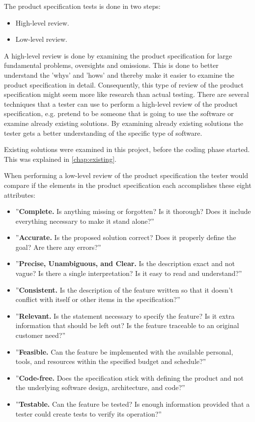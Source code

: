 The product specification tests is done in two steps:

\begin{itemize}
	\item High-level review.
	\item Low-level review.
\end{itemize}

A high-level review is done by examining the product specification for large fundamental problems, oversights and omissions.
This is done to better understand the 'whys' and 'hows' and thereby make it easier to examine the product specification in detail.
Consequently, this type of review of the product specification might seem more like research than actual testing.
There are several techniques that a tester can use to perform a high-level review of the product specification, e.g. pretend to be someone that is going to use the software or examine already existing solutions.
By examining already existing solutions the tester gets a better understanding of the specific type of software. \cite{SoftwareTesting}

Existing solutions were examined in this project, before the coding phase started.
This was explained in \cref{chap:existing}.

When performing a low-level review of the product specification the tester would compare if the elements in the product specification each accomplishes these eight attributes: \cite{SoftwareTesting}

\begin{itemize}
	\item ''\textbf{Complete.} Is anything missing or forgotten? Is it thorough? Does it include everything necessary to make it stand alone?''
	\item ''\textbf{Accurate.} Is the proposed solution correct? Does it properly define the goal? Are there any errors?''
	\item ''\textbf{Precise, Unambiguous, and Clear.} Is the description exact and not vague? Is there a single interpretation? Is it easy to read and understand?''
	\item ''\textbf{Consistent.} Is the description of the feature written so that it doesn't conflict with itself or other items in the specification?''
	\item ''\textbf{Relevant.} Is the statement necessary to specify the feature? Is it extra information that should be left out? Is the feature traceable to an original customer need?''
	\item ''\textbf{Feasible.} Can the feature be implemented with the available personal, tools, and resources within the specified budget and schedule?''
	\item ''\textbf{Code-free.} Does the specification stick with defining the product and not the underlying software design, architecture, and code?''
	\item ''\textbf{Testable.} Can the feature be tested? Is enough information provided that a tester could create tests to verify its operation?''
\end{itemize}

